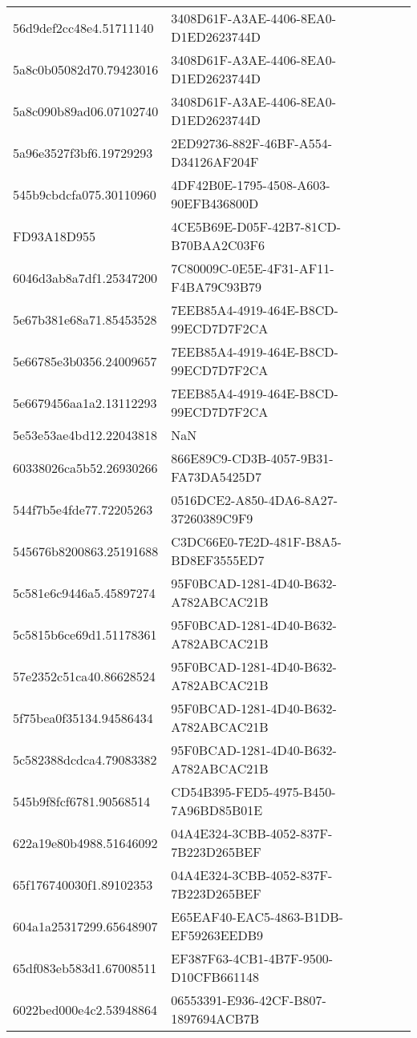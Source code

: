 \begin{tabular}{ll}
56d9def2cc48e4.51711140 & 3408D61F-A3AE-4406-8EA0-D1ED2623744D \\
5a8c0b05082d70.79423016 & 3408D61F-A3AE-4406-8EA0-D1ED2623744D \\
5a8c090b89ad06.07102740 & 3408D61F-A3AE-4406-8EA0-D1ED2623744D \\
5a96e3527f3bf6.19729293 & 2ED92736-882F-46BF-A554-D34126AF204F \\
545b9cbdcfa075.30110960 & 4DF42B0E-1795-4508-A603-90EFB436800D \\
FD93A18D955 & 4CE5B69E-D05F-42B7-81CD-B70BAA2C03F6 \\
6046d3ab8a7df1.25347200 & 7C80009C-0E5E-4F31-AF11-F4BA79C93B79 \\
5e67b381e68a71.85453528 & 7EEB85A4-4919-464E-B8CD-99ECD7D7F2CA \\
5e66785e3b0356.24009657 & 7EEB85A4-4919-464E-B8CD-99ECD7D7F2CA \\
5e6679456aa1a2.13112293 & 7EEB85A4-4919-464E-B8CD-99ECD7D7F2CA \\
5e53e53ae4bd12.22043818 & NaN \\
60338026ca5b52.26930266 & 866E89C9-CD3B-4057-9B31-FA73DA5425D7 \\
544f7b5e4fde77.72205263 & 0516DCE2-A850-4DA6-8A27-37260389C9F9 \\
545676b8200863.25191688 & C3DC66E0-7E2D-481F-B8A5-BD8EF3555ED7 \\
5c581e6c9446a5.45897274 & 95F0BCAD-1281-4D40-B632-A782ABCAC21B \\
5c5815b6ce69d1.51178361 & 95F0BCAD-1281-4D40-B632-A782ABCAC21B \\
57e2352c51ca40.86628524 & 95F0BCAD-1281-4D40-B632-A782ABCAC21B \\
5f75bea0f35134.94586434 & 95F0BCAD-1281-4D40-B632-A782ABCAC21B \\
5c582388dcdca4.79083382 & 95F0BCAD-1281-4D40-B632-A782ABCAC21B \\
545b9f8fcf6781.90568514 & CD54B395-FED5-4975-B450-7A96BD85B01E \\
622a19e80b4988.51646092 & 04A4E324-3CBB-4052-837F-7B223D265BEF \\
65f176740030f1.89102353 & 04A4E324-3CBB-4052-837F-7B223D265BEF \\
604a1a25317299.65648907 & E65EAF40-EAC5-4863-B1DB-EF59263EEDB9 \\
65df083eb583d1.67008511 & EF387F63-4CB1-4B7F-9500-D10CFB661148 \\
6022bed000e4c2.53948864 & 06553391-E936-42CF-B807-1897694ACB7B \\

\end{tabular}
